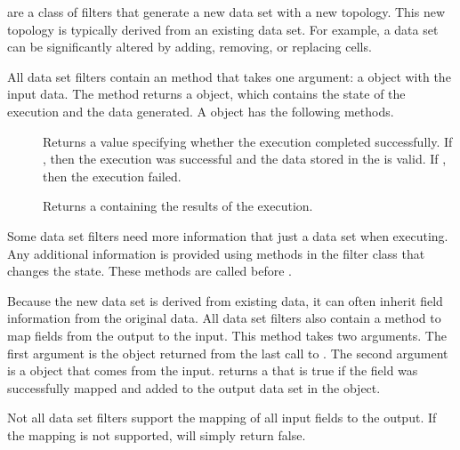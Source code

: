  are a class of filters that generate a new data
set with a new topology. This new topology is typically derived from an
existing data set. For example, a data set can be significantly altered by
adding, removing, or replacing cells.

All data set filters contain an  method that takes one
argument: a  object with the input data. The
 method returns a  object,
which contains the state of the execution and the data generated. A
 object has the following methods.

\begin{description}
\item[] Returns a  value specifying
  whether the execution completed successfully. If , then
  the execution was successful and the data stored in the
   is valid. If , then the
  execution failed.
\item[] Returns a  containing
  the results of the execution.
\end{description}

Some data set filters need more information that just a data set when
executing. Any additional information is provided using methods in the
filter class that changes the state. These methods are called before
.

Because the new data set is derived from existing data, it can often
inherit field information from the original data. All data set filters also
contain a  method to map fields from the
output to the input. This method takes two arguments. The first argument is
the  object returned from the last call to
. The second argument is a  object that
comes from the input.  returns a
 that is true if the field was successfully mapped and added
to the output data set in the  object.

\begin{commonerrors}
  Not all data set filters support the mapping of all input fields to the
  output. If the mapping is not supported, 
  will simply return false.
\end{commonerrors}

